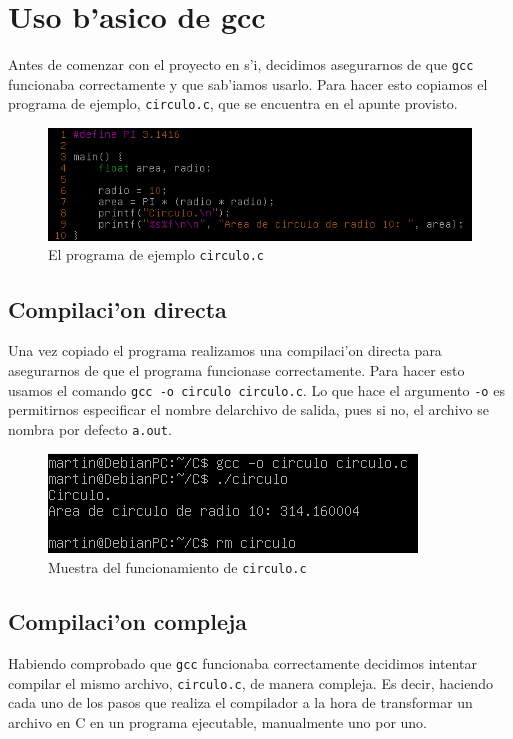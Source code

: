 \documentclass[11pt]{article}
\begin{document}
		
	\section{Uso b'asico de gcc}
		Antes de comenzar con el proyecto en s'i, decidimos asegurarnos de que \texttt{gcc} funcionaba correctamente y que sab'iamos usarlo. Para hacer esto copiamos el programa de ejemplo, \texttt{circulo.c}, que se encuentra en el apunte provisto.
		
		\begin{figure}[H]
			\centering
			\includegraphics[width=.9\linewidth]{Images/Seccion 1/S1}
			\caption{El programa de ejemplo \texttt{circulo.c}}
		\end{figure}
		
	\subsection{Compilaci'on directa}
		Una vez copiado el programa realizamos una compilaci'on directa para asegurarnos de que el programa funcionase correctamente. Para hacer esto usamos el comando \texttt{gcc -o circulo circulo.c}. Lo que hace el argumento \texttt{-o} es permitirnos especificar el nombre delarchivo de salida, pues si no, el archivo se nombra por defecto \texttt{a.out}.
		
		\begin{figure}[H]
			\centering
			\includegraphics[width=.7\linewidth]{Images/Seccion 1/S1 parte dos}
			\caption{Muestra del funcionamiento de \texttt{circulo.c}}
			\label{fig:basic-compilation}
		\end{figure}
		
	\subsection{Compilaci'on compleja}
		Habiendo comprobado que \texttt{gcc} funcionaba correctamente decidimos intentar compilar el mismo archivo, \texttt{circulo.c}, de manera compleja. Es decir, haciendo cada uno de los pasos que realiza el compilador a la hora de transformar un archivo en C en un programa ejecutable, manualmente uno por uno.
	
\end{document}
